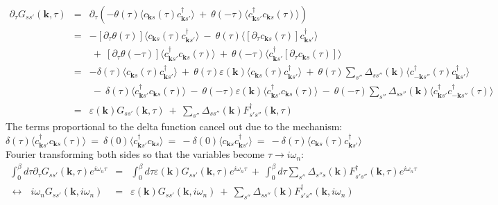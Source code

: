 \documentclass[a4j]{jsarticle}
\begin{document}
\begin{eqnarray}
	\partial_{\tau} G_{ss'}(\bm{k} , \tau)
	&=&
	\partial_{\tau}
	\left(
	-
	\theta(\tau)
	\langle c_{\bm{k}s}(\tau) c_{\bm{k} s'}^{\dagger} \rangle
	\ + \
	\theta(- \tau)
	\langle c_{\bm{k} s'}^{\dagger} c_{\bm{k}s}(\tau) \rangle
	\right)
	\nonumber \\[4mm] &=&
	-
	[\partial_{\tau} \theta(\tau) ]
	\langle c_{\bm{k}s}(\tau) c_{\bm{k} s'}^{\dagger} \rangle
	\ - \
	\theta(\tau)
	\langle
	[
		\partial_{\tau}
		c_{\bm{k}s}(\tau)
	]
	c_{\bm{k} s'}^{\dagger} \rangle
	\nonumber \\[2mm] &&
	\ + \
	[\partial_{\tau} \theta(- \tau) ]
	\langle c_{\bm{k} s'}^{\dagger} c_{\bm{k}s}(\tau) \rangle
	\ + \
	\theta(- \tau)
	\langle c_{\bm{k} s'}^{\dagger}
		[
			\partial_{\tau}
			c_{\bm{k}s}(\tau)
		]
	\rangle
	\nonumber \\[4mm] &=&
	-
	\delta(\tau)
	\langle c_{\bm{k}s}(\tau) c_{\bm{k} s'}^{\dagger} \rangle
	\ + \
	\theta(\tau)
	\varepsilon( \bm{k} )
	\langle
	c_{\bm{k} s} (\tau)
	c_{\bm{k} s'}^{\dagger}
	\rangle
	\ + \
	\theta(\tau)
	\sum_{ s'' }
	\Delta_{ s s'' }( \bm{k} )
	\langle
	c_{ - \bm{k} s''}^{\dagger}(\tau)
	c_{\bm{k} s'}^{\dagger}
	\rangle
	\nonumber \\[2mm] &&
	\ - \
	\delta ( \tau )
	\langle c_{\bm{k} s'}^{\dagger} c_{\bm{k}s}(\tau) \rangle
	\ - \
	\theta(- \tau)
	\varepsilon( \bm{k} )
	\langle
	c_{\bm{k} s'}^{\dagger}
	c_{\bm{k} s} (\tau)
	\rangle
	\ - \
	\theta(-\tau)
	\sum_{ s'' }
	\Delta_{ s s'' }( \bm{k} )
	\langle
	c_{\bm{k} s'}^{\dagger}
	c_{ - \bm{k} s''}^{\dagger}(\tau)
	\rangle
	\nonumber \\[2mm] &=&
	\varepsilon( \bm{k} )
	G_{ss'}(\bm{k} , \tau)
	\ + \
	\sum_{s''}
	\Delta_{ s s'' }( \bm{k} )
	F_{ s' s'' }^{\dagger} ( \bm{k} , \tau)
\end{eqnarray}
%
%
%
%
The terms proportional to the delta function cancel out due to the mechanism:
$$
	\delta ( \tau )
	\langle c_{\bm{k} s'}^{\dagger} c_{\bm{k}s}(\tau) \rangle
	\ = \
	\delta ( 0 )
	\langle c_{\bm{k} s'}^{\dagger} c_{\bm{k}s} \rangle
	\ = \
	-
	\delta ( 0 )
	\langle c_{\bm{k}s} c_{\bm{k} s'}^{\dagger} \rangle
	\ = \
	-
	\delta ( \tau )
	\langle c_{\bm{k}s}(\tau) c_{\bm{k} s'}^{\dagger} \rangle
$$
Fourier transforming both sides so that the variables become $\tau \to i \omega_{n}$:
%
%
%
%
\begin{eqnarray}
	\int^{\beta}_{0} d \tau
	\partial_{\tau}
	G_{ss'}(\bm{k} , \tau)
	e^{i \omega_{n} \tau}
	&=&
	\int^{\beta}_{0} d \tau
	\varepsilon( \bm{k} )
	G_{ss'}(\bm{k} , \tau)
	e^{i \omega_{n} \tau}
	\ + \
	\int^{\beta}_{0} d \tau
	\sum_{s''}
	\Delta_{ s'' s }( \bm{k} )
	F_{ s' s'' }^{\dagger} ( \bm{k} , \tau)
	e^{i \omega_{n} \tau}
	\nonumber \\[2mm]
	\longleftrightarrow \ \ \
	i \omega_{n}
	G_{ss'}(\bm{k} , i \omega_{n} )
	&=&
	\varepsilon( \bm{k} )
	G_{ss'}(\bm{k} , i \omega_{n} )
	\ + \
	\sum_{s''}
	\Delta_{ s s'' }( \bm{k} )
	F_{ s' s'' }^{\dagger} ( \bm{k} , i \omega_{n} )
\end{eqnarray}
\end{document}
